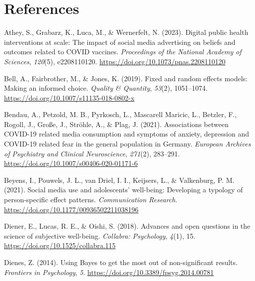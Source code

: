 \documentclass[
  man,mask,floatsintext]{apa7}
\newlength{\cslhangindent}
\newlength{\cslentryspacingunit} %
\newenvironment{CSLReferences}[2] %
 {%
  \setlength{\parindent}{0pt}
  \ifodd #1
  \let\oldpar\par
  \def\par{\hangindent=\cslhangindent\oldpar}
  \fi
  \setlength{\parskip}{#2\cslentryspacingunit}
 }%
 {}
\begin{document}
\newpage

\hypertarget{references}{%
\section{References}\label{references}}

\hypertarget{refs}{}
\begin{CSLReferences}{1}{0}
\leavevmode{}%
Athey, S., Grabarz, K., Luca, M., \& Wernerfelt, N. (2023). Digital public health interventions at scale: {The} impact of social media advertising on beliefs and outcomes related to {COVID} vaccines. \emph{Proceedings of the National Academy of Sciences}, \emph{120}(5), e2208110120. \url{https://doi.org/10.1073/pnas.2208110120}

\leavevmode{}%
Bell, A., Fairbrother, M., \& Jones, K. (2019). Fixed and random effects models: Making an informed choice. \emph{Quality \& Quantity}, \emph{53}(2), 1051--1074. \url{https://doi.org/10.1007/s11135-018-0802-x}

\leavevmode{}%
Bendau, A., Petzold, M. B., Pyrkosch, L., Mascarell Maricic, L., Betzler, F., Rogoll, J., Große, J., Ströhle, A., \& Plag, J. (2021). Associations between {COVID-19} related media consumption and symptoms of anxiety, depression and {COVID-19} related fear in the general population in {Germany}. \emph{European Archives of Psychiatry and Clinical Neuroscience}, \emph{271}(2), 283--291. \url{https://doi.org/10.1007/s00406-020-01171-6}

\leavevmode{}%
Beyens, I., Pouwels, J. L., van Driel, I. I., Keijsers, L., \& Valkenburg, P. M. (2021). Social media use and adolescents' well-being: {Developing} a typology of person-specific effect patterns. \emph{Communication Research}. \url{https://doi.org/10.1177/00936502211038196}

\leavevmode{}%
Diener, E., Lucas, R. E., \& Oishi, S. (2018). Advances and open questions in the science of subjective well-being. \emph{Collabra: Psychology}, \emph{4}(1), 15. \url{https://doi.org/10.1525/collabra.115}

\leavevmode{}%
Dienes, Z. (2014). Using {Bayes} to get the most out of non-significant results. \emph{Frontiers in Psychology}, \emph{5}. \url{https://doi.org/10.3389/fpsyg.2014.00781}


\end{CSLReferences}
\end{document}
